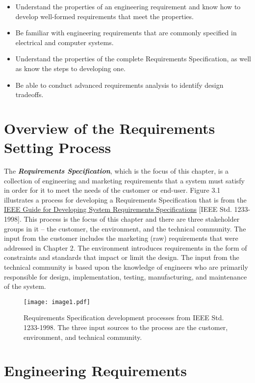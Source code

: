 \begin{itemize}
\item
  Understand the properties of an engineering requirement and know how
  to develop well-formed requirements that meet the properties.
\item
  Be familiar with engineering requirements that are commonly specified
  in electrical and computer systems.
\item
  Understand the properties of the complete Requirements Specification,
  as well as know the steps to developing one.
\item
  Be able to conduct advanced requirements analysis to identify design
  tradeoffs.
\end{itemize}

\section{Overview of the Requirements Setting Process}
\label{section':overview-of-the-requirements-setting-process}

The \emph{\textbf{Requirements Specification}}, which is the focus of
this chapter, is a collection of engineering and marketing requirements
that a system must satisfy in order for it to meet the needs of the
customer or end-user. Figure 3.1 illustrates a process for developing a
Requirements Specification that is from the \ul{IEEE Guide for
Developing System Requirements Specifications} {[}IEEE Std.
1233-1998{]}. This process is the focus of this chapter and there are
three stakeholder groups in it -- the customer, the environment, and the
technical community. The input from the customer includes the marketing
(raw) requirements that were addressed in Chapter 2. The environment
introduces requirements in the form of constraints and standards that
impact or limit the design. The input from the technical community is
based upon the knowledge of engineers who are primarily responsible for
design, implementation, testing, manufacturing, and maintenance of the
system.

\begin{figure}
\texttt{[image: image1.pdf]}
\caption{Requirements Specification development processes
from IEEE Std. 1233-1998. The three input sources to the process are the
customer, environment, and technical community.}
\label{figure: }
\end{figure}

\section{Engineering Requirements}
\label{section:engineering-requirements}

